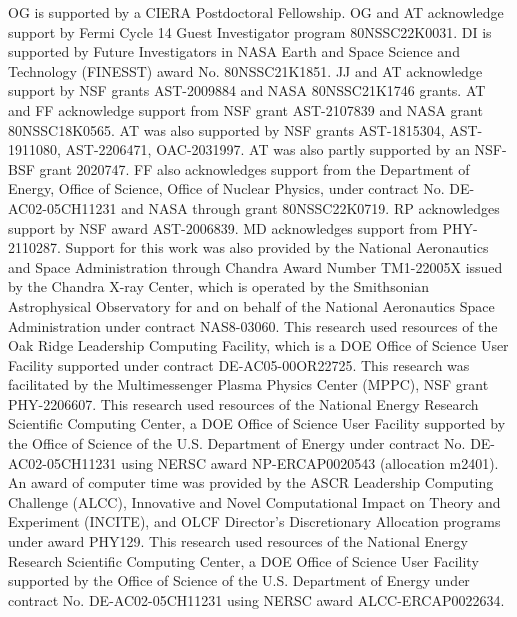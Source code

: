 \documentclass[twocolumn,dvipsnames]{aastex62}
\begin{document}
\begin{acknowledgements}

OG is supported by a CIERA Postdoctoral Fellowship.
OG and AT acknowledge support by Fermi Cycle 14 Guest Investigator program 80NSSC22K0031.
DI is supported by Future Investigators in NASA Earth and Space Science and Technology (FINESST) award No. 80NSSC21K1851. %
JJ and AT acknowledge support by NSF grants AST-2009884 %
and NASA 80NSSC21K1746 %
grants.
AT and FF acknowledge support from 
NSF grant AST-2107839 %
and NASA grant 80NSSC18K0565. %
AT was also supported by NSF grants
AST-1815304, %
AST-1911080, %
AST-2206471, %
OAC-2031997.  %
AT was also partly supported by an NSF-BSF grant 2020747.
FF also acknowledges support from the Department of Energy, Office of Science, Office of Nuclear Physics, under contract No. DE-AC02-05CH11231 and NASA through grant 80NSSC22K0719.
RP acknowledges support by NSF award AST-2006839.
MD acknowledges support from PHY-2110287.
Support for this work was also provided by the National Aeronautics and Space Administration through Chandra Award Number TM1-22005X issued by the Chandra X-ray Center, which is operated by the Smithsonian Astrophysical Observatory for and on behalf of the National Aeronautics Space Administration under contract NAS8-03060.
This research used resources of the Oak Ridge Leadership Computing Facility, which is a DOE Office of Science User Facility supported under contract DE-AC05-00OR22725.  This research was facilitated by the Multimessenger Plasma Physics Center (MPPC), NSF grant PHY-2206607.  This research used resources of the National Energy Research Scientific Computing Center, a DOE Office of Science User Facility supported by the Office of Science of the U.S. Department of Energy under contract No. DE-AC02-05CH11231 using NERSC award NP-ERCAP0020543 (allocation m2401).
An award of computer time was provided by the ASCR Leadership Computing Challenge (ALCC), Innovative and Novel Computational Impact on Theory and Experiment (INCITE), and OLCF Director's Discretionary Allocation  programs under award PHY129. This research used resources of the National Energy Research Scientific Computing Center, a DOE Office of Science User Facility supported by the Office of Science of the U.S. Department of Energy under contract No. DE-AC02-05CH11231 using NERSC award ALCC-ERCAP0022634.
    
\end{acknowledgements}
\end{document}

